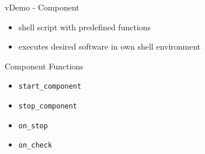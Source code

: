 \begin{frame}[fragile]{vDemo - Component}
	\begin{itemize}
		\item shell script with predefined functions
		\item executes desired software in own shell environment %
	\end{itemize}
	
	\alert{Component Functions} %
	\begin{itemize}
		\item \texttt{start\_component}
		\item \texttt{stop\_component}
		\item \texttt{on\_stop}
		\item \texttt{on\_check}
	\end{itemize}
	
	
\end{frame}